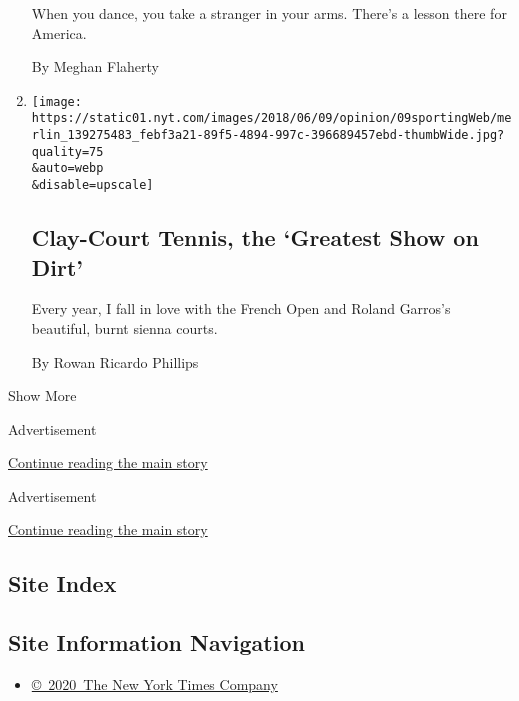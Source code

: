 \begin{enumerate}
  When you dance, you take a stranger in your arms. There's a lesson
  there for America.

  By Meghan Flaherty
\item
  \href{/2018/06/09/opinion/french-open-clay-roland-garros.html}{}

  \texttt{[image: https://static01.nyt.com/images/2018/06/09/opinion/09sportingWeb/merlin\_139275483\_febf3a21-89f5-4894-997c-396689457ebd-thumbWide.jpg?quality=75\\\&auto=webp\\\&disable=upscale]}

  \hypertarget{clay-court-tennis-the-greatest-show-on-dirt}{%
  \subsection{Clay-Court Tennis, the `Greatest Show on
  Dirt'}\label{clay-court-tennis-the-greatest-show-on-dirt}}

  Every year, I fall in love with the French Open and Roland Garros's
  beautiful, burnt sienna courts.

  By Rowan Ricardo Phillips
\end{enumerate}

Show More

Advertisement

\protect\hyperlink{after-mid1}{Continue reading the main story}

Advertisement

\protect\hyperlink{after-mktg}{Continue reading the main story}

\hypertarget{site-index}{%
\subsection{Site Index}\label{site-index}}

\hypertarget{site-information-navigation}{%
\subsection{Site Information
Navigation}\label{site-information-navigation}}

\begin{itemize}
\tightlist
\item
  \href{https://help.nytimes.com/hc/en-us/articles/115014792127-Copyright-notice}{©~2020~The
  New York Times Company}
\end{itemize}

